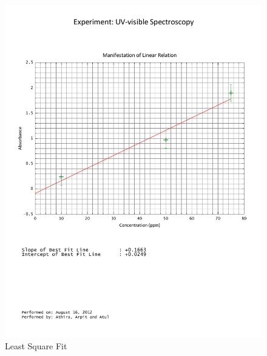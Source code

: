 	\begin{figure}[bth]
		\begin{center}
			\includegraphics[width=1.3\linewidth]{gfx/1A_bestfit.pdf}
		\end{center}
	\caption[Least Square Fit]{Least Square Fit}
	\label{1A_graph}
	\end{figure}
